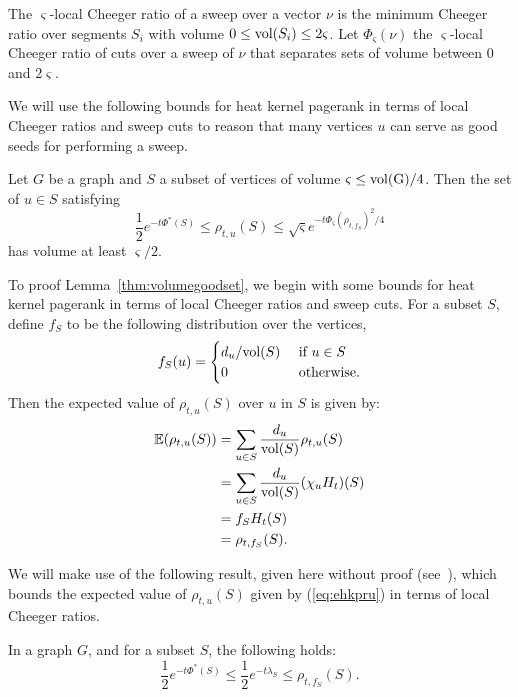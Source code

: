 \documentclass[runningheads,a4paper]{llncs}
\newcommand{\E}{\mathbb{E}}
\newcommand{\vol}{\textmd{vol}}
\newcommand{\localcheeg}{\Phi^*(S)}
\begin{document}
The $\varsigma$-local Cheeger ratio of a sweep over a vector $\nu$ is the
minimum Cheeger ratio over segments $S_i$ with volume $0 \leq \vol(S_i)\leq
2\varsigma$.  Let $\Phi_{\varsigma}(\nu)$ the $\varsigma$-local Cheeger ratio of
cuts over a sweep of $\nu$ that separates sets of volume between $0$ and
$2\varsigma$.

We will use the following bounds for heat kernel pagerank in terms of local
Cheeger ratios and sweep cuts to reason that many vertices $u$ can serve as good
seeds for performing a sweep.

\begin{lemma}
\label{thm:volumegoodset}
Let $G$ be a graph and $S$ a subset of vertices of volume $\varsigma \leq
\rm{vol}(G)/4$.  Then the set of $u\in S$ satisfying
\begin{equation*}
\frac{1}{2}e^{-t\localcheeg} 
\leq \rho_{t,u}(S)
\leq \sqrt{\varsigma}e^{-t\Phi_{\varsigma}(\rho_{t,f_S})^2/4}
\end{equation*}
has volume at least $\varsigma/2$.
\end{lemma}

To proof Lemma~\ref{thm:volumegoodset}, we begin with some bounds for heat
kernel pagerank in terms of local Cheeger ratios and sweep cuts.  For a subset
$S$, define $f_S$ to be the following distribution over the vertices,
\begin{equation*}
f_S(u) =
\begin{cases}
d_u/\vol(S) & \mbox{ if }u\in S\\
0 & \mbox{ otherwise.}
\end{cases}
\end{equation*}
Then the expected value of $\rho_{t,u}(S)$ over $u$ in $S$ is given by:
\begin{align}
\E(\rho_{t,u}(S)) &= \sum\limits_{u\in S}\frac{d_u}{\vol(S)}\rho_{t,u}(S)\nonumber\\
&= \sum\limits_{u\in S}\frac{d_u}{\vol(S)}(\chi_u H_t)(S)\nonumber\\
&= f_S H_t(S)\nonumber\\
&= \rho_{t,f_S}(S).\label{eq:ehkpru}
\end{align}

We will make use of the following result, given here without proof
(see~\cite{chung:partitionhkpr:im09}), which bounds the expected value of
$\rho_{t,u}(S)$ given by (\ref{eq:ehkpru}) in terms of local Cheeger ratios.

\begin{lemma}
\label{lem:lowerbound}
In a graph $G$, and for a subset $S$, the following holds:
\[
\frac{1}{2}e^{-t\localcheeg} \leq \frac{1}{2}e^{-t\lambda_S} \leq \rho_{t,f_S}(S).
\]
\end{lemma}
\end{document}
